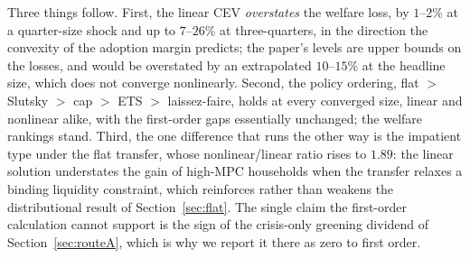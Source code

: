 

Three things follow. First, the linear CEV \emph{overstates} the welfare loss, by
$1$--$2\%$ at a quarter-size shock and up to $7$--$26\%$ at three-quarters, in the
direction the convexity of the adoption margin predicts; the paper's levels are
upper bounds on the losses, and would be overstated by an extrapolated
$10$--$15\%$ at the headline size, which does not converge nonlinearly. Second,
the policy ordering, flat $>$ Slutsky $>$ cap $>$ ETS $>$ laissez-faire, holds
at every converged size, linear and nonlinear alike, with the first-order gaps
essentially unchanged; the welfare rankings stand. Third, the one difference that
runs the other way is the impatient type under the flat transfer, whose
nonlinear/linear ratio rises to $1.89$: the linear solution understates the gain
of high-MPC households when the transfer relaxes a binding liquidity constraint,
which reinforces rather than weakens the distributional result of
Section~\ref{sec:flat}. The single claim the first-order calculation cannot
support is the sign of the crisis-only greening dividend of
Section~\ref{sec:routeA}, which is why we report it there as zero to first order.
